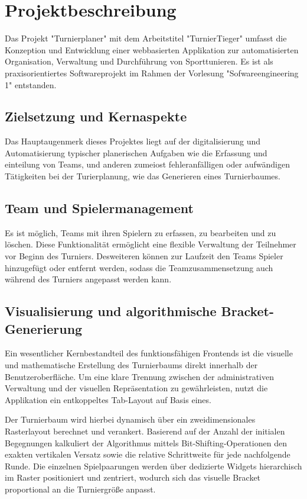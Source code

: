 \section{Projektbeschreibung}
Das Projekt "Turnierplaner" mit dem Arbeitstitel "TurnierTieger" umfasst die Konzeption und Entwicklung einer webbasierten Applikation zur automatisierten Organisation, Verwaltung und Durchführung von Sporttunieren. Es ist als praxisorientiertes Softwareprojekt im Rahmen der Vorlesung "Sofwareengineering 1" entstanden.
\subsection{Zielsetzung und Kernaspekte}
Das Hauptaugenmerk dieses Projektes liegt auf der digitalisierung und Automatisierung typischer planerischen Aufgaben wie die Erfassung und einteilung von Teams, und anderen zumeiost fehleranfälligen oder aufwändigen Tätigkeiten bei der Turierplanung, wie das Generieren eines Turnierbaumes.
\subsection{Team und Spielermanagement}
Es ist möglich, Teams mit ihren Spielern zu erfassen, zu bearbeiten und zu löschen. Diese Funktionalität ermöglicht eine flexible Verwaltung der Teilnehmer vor Beginn des Turniers. Desweiteren können zur Laufzeit den Teams Spieler hinzugefügt oder entfernt werden, sodass die Teamzusammensetzung auch während des Turniers angepasst werden kann.
\subsection{Visualisierung und algorithmische Bracket-Generierung}
Ein wesentlicher Kernbestandteil des funktionsfähigen Frontends ist die visuelle und mathematische Erstellung des Turnierbaums direkt innerhalb der Benutzeroberfläche. Um eine klare Trennung zwischen der administrativen Verwaltung und der visuellen Repräsentation zu gewährleisten, nutzt die Applikation ein entkoppeltes Tab-Layout auf Basis eines. 

Der Turnierbaum wird hierbei dynamisch über ein zweidimensionales Rasterlayout  berechnet und verankert. Basierend auf der Anzahl der initialen Begegnungen kalkuliert der Algorithmus mittels Bit-Shifting-Operationen den exakten vertikalen Versatz sowie die relative Schrittweite für jede nachfolgende Runde. Die einzelnen Spielpaarungen werden über dedizierte Widgets hierarchisch im Raster positioniert und zentriert, wodurch sich das visuelle Bracket proportional an die Turniergröße anpasst.


